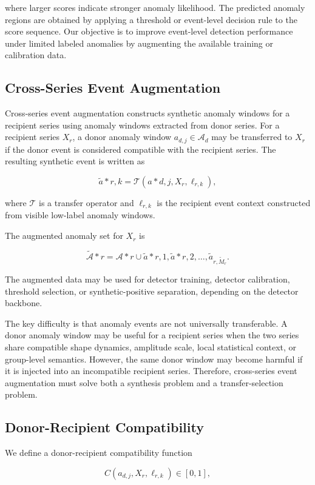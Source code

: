 \documentclass[conference]{IEEEtran}
\begin{document}
where larger scores indicate stronger anomaly likelihood. The predicted anomaly regions are obtained by applying a threshold or event-level decision rule to the score sequence. Our objective is to improve event-level detection performance under limited labeled anomalies by augmenting the available training or calibration data.

\subsection{Cross-Series Event Augmentation}
Cross-series event augmentation constructs synthetic anomaly windows for a recipient series using anomaly windows extracted from donor series. For a recipient series $X_r$, a donor anomaly window $a_{d,j}\in\mathcal{A}_d$ may be transferred to $X_r$ if the donor event is considered compatible with the recipient series. The resulting synthetic event is written as

\[
\tilde{a}*{r,k}
=
\mathcal{T}(a*{d,j},X_r,\ell_{r,k}),
\]

where $\mathcal{T}$ is a transfer operator and $\ell_{r,k}$ is the recipient event context constructed from visible low-label anomaly windows.

The augmented anomaly set for $X_r$ is

\[
\widetilde{\mathcal{A}}*r
=
\mathcal{A}*r
\cup
{\tilde{a}*{r,1},\tilde{a}*{r,2},\ldots,\tilde{a}_{r,\widetilde{M}_r}}.
\]

The augmented data may be used for detector training, detector calibration, threshold selection, or synthetic-positive separation, depending on the detector backbone.

The key difficulty is that anomaly events are not universally transferable. A donor anomaly window may be useful for a recipient series when the two series share compatible shape dynamics, amplitude scale, local statistical context, or group-level semantics. However, the same donor window may become harmful if it is injected into an incompatible recipient series. Therefore, cross-series event augmentation must solve both a synthesis problem and a transfer-selection problem.

\subsection{Donor-Recipient Compatibility}

We define a donor-recipient compatibility function

\[
C(a_{d,j},X_r,\ell_{r,k})\in[0,1],
\]
\end{document}
